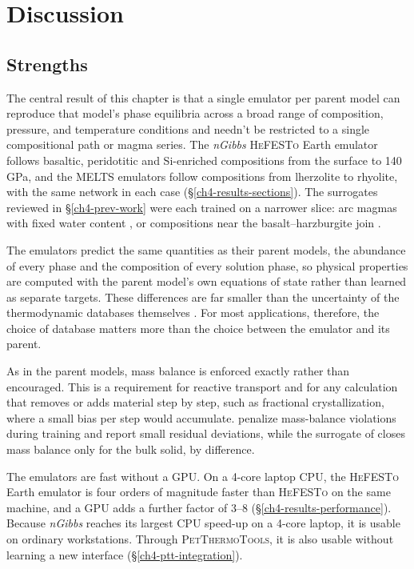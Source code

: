 \section{Discussion}\label{ch4-discussion}

\subsection{Strengths}\label{ch4-discussion-strengths}

The central result of this chapter is that a single emulator per parent model can reproduce that model's phase equilibria across
a broad range of composition, pressure, and temperature conditions and needn't be restricted to a single compositional path or magma series. 
The \emph{nGibbs} \textsc{HeFESTo} Earth emulator follows basaltic, peridotitic and Si-enriched compositions from the surface to 140\,GPa, and the
\textsc{MELTS} emulators follow compositions from lherzolite to rhyolite, with the same network in each case
(\S\ref{ch4-results-sections}). The surrogates reviewed in \S\ref{ch4-prev-work} were each trained on a narrower slice: arc magmas
with fixed water content \citep{candioti2026}, or compositions near the basalt--harzburgite join
\citep{hartmeier2026,yuan2025igythem}.

The emulators predict the same quantities as their parent models, the abundance of every phase and the composition of every
solution phase, so physical properties are computed with the parent model's own equations of state rather than learned as separate
targets. These differences are far smaller than the uncertainty of the thermodynamic databases themselves \citep{ghiorsosack1995,ghiorso2002,stixrude2005,riel2022,holland1998}. 
For most applications, therefore, the choice of database matters more than the choice between the emulator and its parent.

As in the parent models, mass balance is enforced exactly rather than encouraged. This is a requirement for reactive transport and for any calculation that
removes or adds material step by step, such as fractional crystallization, where a small bias per step would accumulate.
\citet{hartmeier2026} penalize mass-balance violations during training and report small residual deviations, while the surrogate of
\citet{candioti2026} closes mass balance only for the bulk solid, by difference.

The emulators are fast without a GPU. On a 4-core laptop CPU, the \textsc{HeFESTo} Earth emulator is four orders of magnitude faster
than \textsc{HeFESTo} on the same machine, and a GPU adds a further factor of 3--8 (\S\ref{ch4-results-performance}). Because \emph{nGibbs} 
reaches its largest CPU speed-up on a 4-core laptop, it is usable on ordinary workstations. Through \textsc{PetThermoTools}, it is also usable without
learning a new interface (\S\ref{ch4-ptt-integration}).

